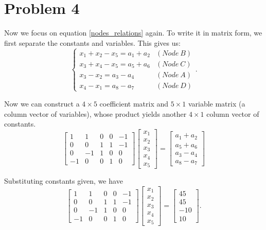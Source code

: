 \documentclass[12pt,a4paper]{article}
\begin{document}
\section*{Problem 4}
\begin{solution}
Now we focus on equation \ref{nodes_relations} again. To write it in matrix form, we first separate the constants and variables. This gives us:
\begin{equation}\label{eqnodeafter}
    \begin{cases}
x_{1} +x_{2} -x_{5} =a_{1} +a_{2} & ( Node\ B)\\
x_{3} +x_{4}-x_5 =a_{5} +a_{6} & ( Node\ C)\\
x_{3} -x_{2} =a_{3} -a_{4} & ( Node\ A)\\
x_{4} -x_{1} =a_{8} -a_{7} & ( Node\ D)
\end{cases}.
\end{equation}

Now we can construct a $4\times 5$ coefficient matrix and $5\times 1$ variable matrix (a column vector of variables), whose product yields another $4\times 1$ column vector of constants.
\[
\begin{bmatrix}
1 & 1 & 0 & 0 & -1 \\
0 & 0 & 1 & 1 & -1 \\
0 & -1 & 1 & 0 & 0 \\
-1 & 0 & 0 & 1 & 0 
\end{bmatrix}
\begin{bmatrix}
x_1 \\
x_2 \\
x_3 \\
x_4 \\
x_5 
\end{bmatrix}
=
\begin{bmatrix}
a_1 + a_2 \\
a_5 + a_6 \\
a_3 - a_4 \\
a_8 - a_7 
\end{bmatrix}
\]

Substituting constants given, we have
\[
\begin{bmatrix}
1 & 1 & 0 & 0 & -1 \\
0 & 0 & 1 & 1 & -1 \\
0 & -1 & 1 & 0 & 0 \\
-1 & 0 & 0 & 1 & 0 
\end{bmatrix}
\begin{bmatrix}
x_1 \\
x_2 \\
x_3 \\
x_4 \\
x_5 
\end{bmatrix}
=
\begin{bmatrix}
45 \\
45\\
-10 \\
10
\end{bmatrix}.
\]


\end{solution}
\end{document}
